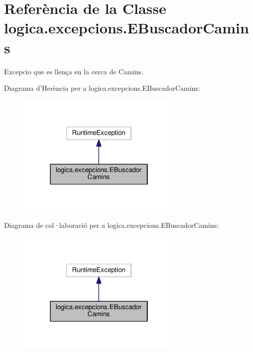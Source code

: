 \hypertarget{classlogica_1_1excepcions_1_1_e_buscador_camins}{\section{Referència de la Classe logica.\+excepcions.\+E\+Buscador\+Camins}
\label{classlogica_1_1excepcions_1_1_e_buscador_camins}
}


Excepcio que es llença en la cerca de Camins.  




Diagrama d'Herència per a logica.\+excepcions.\+E\+Buscador\+Camins\+:
\nopagebreak
\begin{figure}[H]
\begin{center}
\leavevmode
\includegraphics[width=226pt]{classlogica_1_1excepcions_1_1_e_buscador_camins__inherit__graph}
\end{center}
\end{figure}


Diagrama de col·laboració per a logica.\+excepcions.\+E\+Buscador\+Camins\+:
\nopagebreak
\begin{figure}[H]
\begin{center}
\leavevmode
\includegraphics[width=226pt]{classlogica_1_1excepcions_1_1_e_buscador_camins__coll__graph}
\end{center}
\end{figure}
